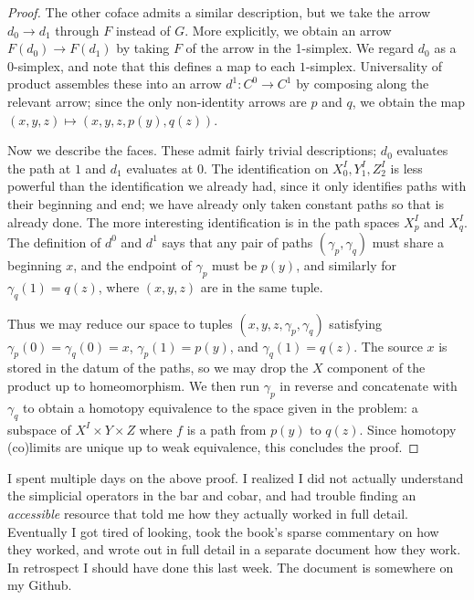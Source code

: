 \begin{proof}
The other coface admits a similar description, but we take the arrow $d_0 \to d_1$ through $F$ instead of $G$. More explicitly, we obtain an arrow $F(d_0)\to F(d_1)$ by taking $F$ of the arrow in the 1-simplex. We regard $d_0$ as a 0-simplex, and note that this defines a map to each $1$-simplex. Universality of product assembles these into an arrow $d^1 : C^0 \to C^1$ by composing along the relevant arrow; since the only non-identity arrows are $p$ and $q$, we obtain the map $(x,y,z)\mapsto (x,y,z,p(y),q(z))$.

Now we describe the faces. These admit fairly trivial descriptions; $d_0$ evaluates the path at $1$ and $d_1$ evaluates at $0$. The identification on $X_0^I,Y_1^I,Z_2^I$ is less powerful than the identification we already had, since it only identifies paths with their beginning and end; we have already only taken constant paths so that is already done. The more interesting identification is in the path spaces $X_p^I$ and $X_q^I$. The definition of $d^0$ and $d^1$ says that any pair of paths $(\gamma_p,\gamma_q)$ must share a beginning $x$, and the endpoint of $\gamma_p$ must be $p(y)$, and similarly for $\gamma_q(1)=q(z)$, where $(x,y,z)$ are in the same tuple.

Thus we may reduce our space to tuples $(x,y,z,\gamma_p,\gamma_q)$ satisfying $\gamma_p(0)=\gamma_q(0)=x$, $\gamma_p(1)=p(y)$, and $\gamma_q(1)=q(z)$. The source $x$ is stored in the datum of the paths, so we may drop the $X$ component of the product up to homeomorphism. We then run $\gamma_p$ in reverse and concatenate with $\gamma_q$ to obtain a homotopy equivalence to the space given in the problem: a subspace of $X^I\times Y\times Z$ where $f$ is a path from $p(y)$ to $q(z)$. Since homotopy (co)limits are unique up to weak equivalence, this concludes the proof.
\end{proof}

\begin{remark}
	I spent multiple days on the above proof. I realized I did not actually understand the simplicial operators in the bar and cobar, and had trouble finding an \emph{accessible} resource that told me how they actually worked in full detail. Eventually I got tired of looking, took the book's sparse commentary on how they worked, and wrote out in full detail in a separate document how they work. In retrospect I should have done this last week. The document is somewhere on my Github.
\end{remark}


